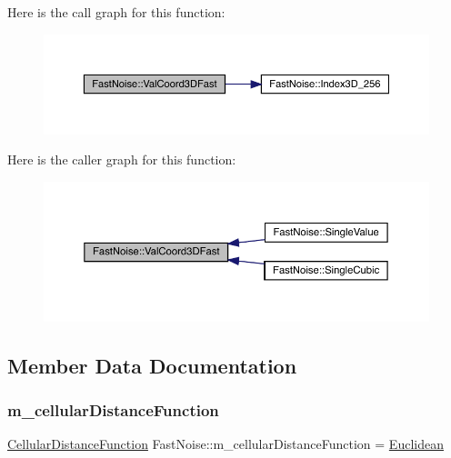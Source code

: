 Here is the call graph for this function\+:
\nopagebreak
\begin{figure}[H]
\begin{center}
\leavevmode
\includegraphics[width=350pt]{class_fast_noise_a8711ebad77216b74f5d248deb024de2f_cgraph}
\end{center}
\end{figure}
Here is the caller graph for this function\+:
\nopagebreak
\begin{figure}[H]
\begin{center}
\leavevmode
\includegraphics[width=350pt]{class_fast_noise_a8711ebad77216b74f5d248deb024de2f_icgraph}
\end{center}
\end{figure}


\subsection{Member Data Documentation}
\mbox{\label{class_fast_noise_a2013ce945eec3663ae04a5b36d3fdff8}} 
\subsubsection{\texorpdfstring{m\+\_\+cellular\+Distance\+Function}{m\_cellularDistanceFunction}}
{\footnotesize\ttfamily \mbox{\hyperlink{class_fast_noise_a457e58d0da6dbe486deb5a21a3db52bf}{Cellular\+Distance\+Function}} Fast\+Noise\+::m\+\_\+cellular\+Distance\+Function = \mbox{\hyperlink{class_fast_noise_a457e58d0da6dbe486deb5a21a3db52bfa71b164a880847b07288ce70507bf1453}{Euclidean}}\hspace{0.3cm}{\ttfamily [private]}}

